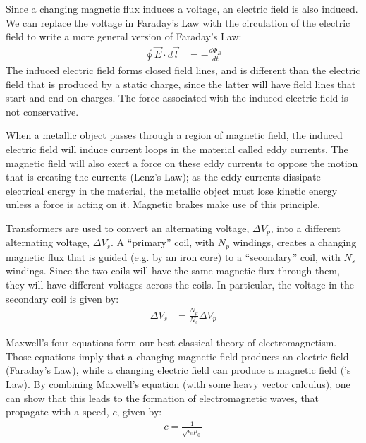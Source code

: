 \begin{chapterSummary}
Since a changing magnetic flux induces a voltage, an electric field is also induced. We can replace the voltage in Faraday's Law with the circulation of the electric field to write a more general version of Faraday's Law:
\begin{align*}
\oint \vec E\cdot d\vec l &= -\frac{d\Phi_B}{dt}
\end{align*}
The induced electric field forms closed field lines, and is different than the electric field that is produced by a static charge, since the latter will have field lines that start and end on charges. The force associated with the induced electric field is not conservative.

When a metallic object passes through a region of magnetic field, the induced electric field will induce current loops in the material called eddy currents. The magnetic field will also exert a force on these eddy currents to oppose the motion that is creating the currents (Lenz's Law); as the eddy currents dissipate electrical energy in the material, the metallic object must lose kinetic energy unless a force is acting on it. Magnetic brakes make use of this principle.

Transformers are used to convert an alternating voltage, $\Delta V_p$, into a different alternating voltage, $\Delta V_s$. A ``primary'' coil, with $N_p$ windings, creates a changing magnetic flux that is guided (e.g. by an iron core) to a ``secondary'' coil, with $N_s$ windings. Since the two coils will have the same magnetic flux through them, they will have different voltages across the coils. In particular, the voltage in the secondary coil is given by:
\begin{align*}
\Delta V_s &= \frac{N_p}{N_s}\Delta V_p
\end{align*}

Maxwell's four equations form our best classical theory of electromagnetism. Those equations imply that a changing magnetic field produces an electric field (Faraday's Law), while a changing electric field can produce a magnetic field (\ampere's Law). By combining Maxwell's equation (with some heavy vector calculus), one can show that this leads to the formation of electromagnetic waves, that propagate with a speed, $c$, given by:
\begin{align*}
c = \frac{1}{\sqrt{\epsilon_0\mu_0}}
\end{align*}


\end{chapterSummary}

